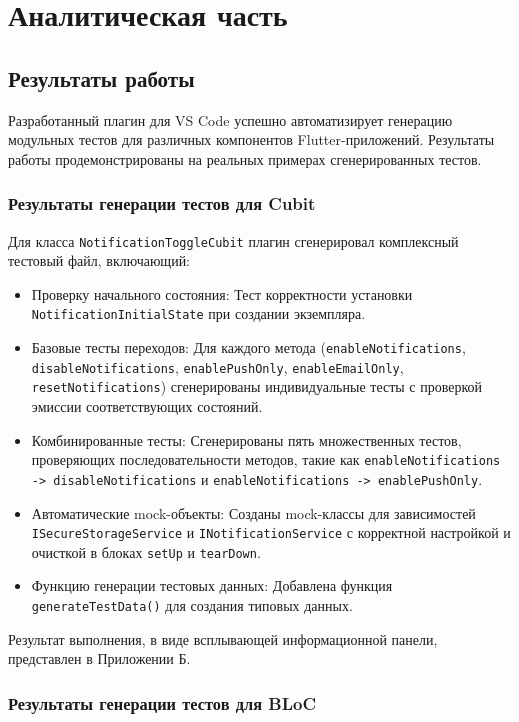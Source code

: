 \documentclass[14pt, russian]{scrartcl}
\begin{document}
\section{Аналитическая часть}

\subsection{Результаты работы}

Разработанный плагин для VS Code успешно автоматизирует генерацию модульных тестов для различных компонентов Flutter-приложений. Результаты работы продемонстрированы на реальных примерах сгенерированных тестов.

\subsubsection{Результаты генерации тестов для Cubit}

Для класса \texttt{NotificationToggleCubit} плагин сгенерировал комплексный тестовый файл, включающий:

\begin{itemize}
    \item Проверку начального состояния: Тест корректности установки \texttt{NotificationInitialState} при создании экземпляра.
    \item Базовые тесты переходов: Для каждого метода (\texttt{enableNotifications}, \texttt{disableNotifications}, \texttt{enablePushOnly}, \texttt{enableEmailOnly}, \texttt{resetNotifications}) сгенерированы индивидуальные тесты с проверкой эмиссии соответствующих состояний.
    \item Комбинированные тесты: Сгенерированы пять множественных тестов, проверяющих последовательности методов, такие как \texttt{enableNotifications -> disableNotifications} и \texttt{enableNotifications -> enablePushOnly}.
    \item Автоматические mock-объекты: Созданы mock-классы для зависимостей \texttt{ISecureStorageService} и \texttt{INotificationService} с корректной настройкой и очисткой в блоках \texttt{setUp} и \texttt{tearDown}.
    \item Функцию генерации тестовых данных: Добавлена функция \texttt{generateTestData()} для создания типовых данных.
\end{itemize}

Результат выполнения, в виде всплывающей информационной панели, представлен в Приложении Б.

\subsubsection{Результаты генерации тестов для BLoC}
\end{document}
